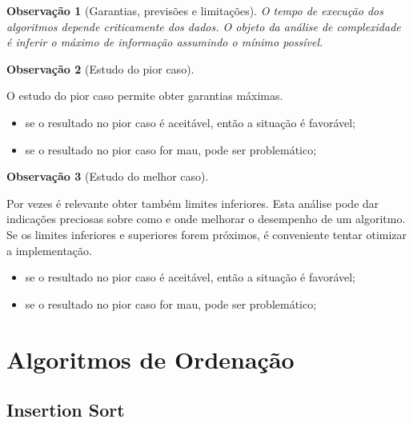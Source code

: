 \documentclass[a4paper, 12pt]{article}
\newtheorem{remark}{Observação}
\begin{document}
\begin{remark}[Garantias, previsões e limitações]
    O tempo de execução dos algoritmos depende criticamente dos dados. O objeto da análise de complexidade é inferir o máximo de informação assumindo o mínimo possível.
\end{remark}

\begin{remark}[Estudo do pior caso]\end{remark}
    O estudo do pior caso permite obter garantias máximas.
    \begin{itemize}
        \item se o resultado no pior caso é aceitável, então a situação é favorável;
        \item se o resultado no pior caso for mau, pode ser problemático;
    \end{itemize}


\begin{remark}[Estudo do melhor caso]\end{remark}
    Por vezes é relevante obter também limites inferiores. Esta análise pode dar indicações preciosas sobre como e onde melhorar o
    desempenho de um algoritmo. Se os limites inferiores e superiores forem próximos, é conveniente tentar otimizar a implementação.
    \begin{itemize}
        \item se o resultado no pior caso é aceitável, então a situação é favorável;
        \item se o resultado no pior caso for mau, pode ser problemático;
    \end{itemize}


\section{Algoritmos de Ordenação}

\subsection{Insertion Sort}
\end{document}
